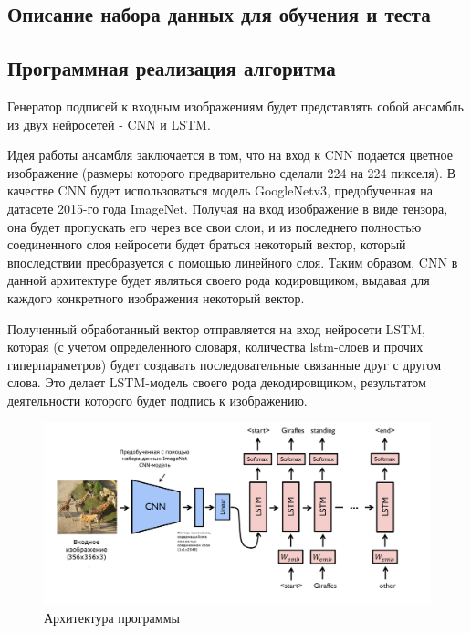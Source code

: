 \documentclass[bachelor, och, coursework]{SCWorks}
\begin{document}
    \subsection{Описание набора данных для обучения и теста}

    \subsection{Программная реализация алгоритма}

        Генератор подписей к входным изображениям будет представлять собой
        ансамбль из двух нейросетей - CNN и LSTM.

        Идея работы ансамбля заключается в том, что на вход к CNN подается
        цветное изображение (размеры которого предварительно сделали 224 на 224
        пикселя). В качестве CNN будет использоваться модель GoogleNetv3,
        предобученная на датасете 2015-го года ImageNet. Получая на вход
        изображение в виде тензора, она будет пропускать его через все свои
        слои, и из последнего полностью соединенного слоя нейросети будет
        браться некоторый вектор, который впоследствии преобразуется с помощью
        линейного слоя. Таким образом, CNN в данной архитектуре будет являться
        своего рода кодировщиком, выдавая для каждого конкретного изображения
        некоторый вектор.
        
        Полученный обработанный вектор отправляется на вход нейросети LSTM,
        которая (с учетом определенного словаря, количества lstm-слоев и прочих
        гиперпараметров) будет создавать последовательные связанные друг с
        другом слова. Это делает LSTM-модель своего рода декодировщиком,
        результатом деятельности которого будет подпись к изображению.

        \begin{figure}[H]
            \centering
            \includegraphics[width=1\textwidth]{pics/arch.png}
            \caption{Архитектура программы}
        \end{figure}
\end{document}
